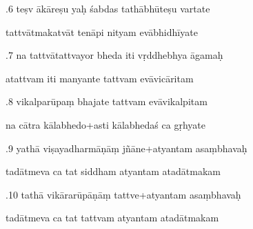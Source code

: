 \documentclass[article,12pt,a4paper]{memoir}%
\newcounter{parCount}
\begin{document}
	  
	  \pstart {}.6 teṣv ākāreṣu yaḥ śabdas tathābhūteṣu vartate 
	{}
	\pend%
      

	  
	  \pstart \leavevmode%
	tattvātmakatvāt tenāpi nityam evābhidhīyate 
	{}
	\pend%
      

	  
	  \pstart {}.7 na tattvātattvayor bheda iti vṛddhebhya āgamaḥ 
	{}
	\pend%
      

	  
	  \pstart \leavevmode%
	atattvam iti manyante tattvam evāvicāritam 
	{}
	\pend%
      

	  
	  \pstart {}.8 vikalparūpaṃ bhajate tattvam evāvikalpitam 
	{}
	\pend%
      

	  
	  \pstart \leavevmode%
	na cātra kālabhedo+asti kālabhedaś ca gṛhyate 
	{}
	\pend%
      

	  
	  \pstart {}.9 yathā viṣayadharmāṇāṃ jñāne+atyantam asaṃbhavaḥ 
	{}
	\pend%
      

	  
	  \pstart \leavevmode%
	tadātmeva ca tat siddham atyantam atadātmakam 
	{}
	\pend%
      

	  
	  \pstart {}.10 tathā vikārarūpāṇāṃ tattve+atyantam asaṃbhavaḥ 
	{}
	\pend%
      

	  
	  \pstart \leavevmode%
	tadātmeva ca tat tattvam atyantam atadātmakam 
	{}
	\pend%
      
\end{document}
